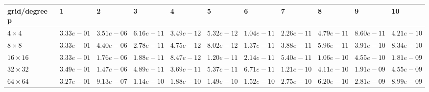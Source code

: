 \begin{tabular}{lllllllllll}
\hline
 grid/degree p   & 1          & 2          & 3          & 4          & 5          & 6          & 7          & 8          & 9          & 10         \\
\hline
 $4 \times 4$    & $3.33e-01$ & $3.51e-06$ & $6.16e-11$ & $3.49e-12$ & $5.32e-12$ & $1.04e-11$ & $2.26e-11$ & $4.79e-11$ & $8.60e-11$ & $4.21e-10$ \\
 $8 \times 8$    & $3.33e-01$ & $4.40e-06$ & $2.78e-11$ & $4.75e-12$ & $8.02e-12$ & $1.37e-11$ & $3.88e-11$ & $5.96e-11$ & $3.91e-10$ & $8.34e-10$ \\
 $16 \times 16$  & $3.33e-01$ & $1.76e-06$ & $1.88e-11$ & $8.47e-12$ & $1.20e-11$ & $2.14e-11$ & $5.40e-11$ & $1.06e-10$ & $4.55e-10$ & $1.81e-09$ \\
 $32 \times 32$  & $3.49e-01$ & $1.47e-06$ & $4.89e-11$ & $3.69e-11$ & $5.37e-11$ & $6.71e-11$ & $1.21e-10$ & $4.11e-10$ & $1.91e-09$ & $4.55e-09$ \\
 $64 \times 64$  & $3.27e-01$ & $9.13e-07$ & $1.14e-10$ & $1.88e-10$ & $1.49e-10$ & $1.52e-10$ & $2.75e-10$ & $6.20e-10$ & $2.81e-09$ & $8.99e-09$ \\
\hline
\end{tabular}